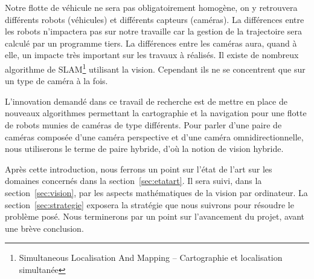 
Notre flotte de véhicule ne sera pas obligatoirement homogène, on y retrouvera différents robots (véhicules) et différents capteurs (caméras).
La différences entre les robots n'impactera pas sur notre travaille car la gestion de la trajectoire sera calculé par un programme tiers.
La différences entre les caméras aura, quand à elle, un impacte très important sur les travaux à réalisés.
Il existe de nombreux algorithme de SLAM\footnote{Simultaneous Localisation And Mapping -- Cartographie et localisation simultanée} utilisant la vision.
Cependant ils ne se concentrent que sur un type de caméra à la fois.

L'innovation demandé dans ce travail de recherche est de mettre en place de nouveaux algorithmes permettant la cartographie et la navigation pour une flotte de robots munies de caméras de type différents.
Pour parler d'une paire de caméras composée d'une caméra perspective et d'une caméra omnidirectionnelle, nous utiliserons le terme de paire hybride, d'où la notion de vision hybride.

\vspace{5mm}
Après cette introduction, nous ferrons un point sur l'état de l'art sur les domaines concernés dans la section~\ref{sec:etatart}.
Il sera suivi, dans la section~\ref{sec:vision}, par les aspects mathématiques de la vision par ordinateur.
La section~\ref{sec:strategie} exposera la stratégie que nous suivrons pour résoudre le problème posé.
Nous terminerons par un point sur l'avancement du projet, avant une brève conclusion.

